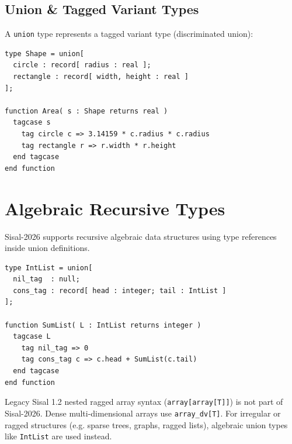 \subsection{Union \& Tagged Variant Types}
A \texttt{union} type represents a tagged variant type (discriminated union):
\begin{lstlisting}[caption={Union Type Declaration}]
type Shape = union[ 
  circle : record[ radius : real ]; 
  rectangle : record[ width, height : real ] 
];

function Area( s : Shape returns real )
  tagcase s
    tag circle c => 3.14159 * c.radius * c.radius
    tag rectangle r => r.width * r.height
  end tagcase
end function
\end{lstlisting}

\section{Algebraic Recursive Types}
Sisal-2026 supports recursive algebraic data structures using type references inside union definitions.

\begin{lstlisting}[caption={Algebraic Recursive List Type}]
type IntList = union[
  nil_tag  : null;
  cons_tag : record[ head : integer; tail : IntList ]
];

function SumList( L : IntList returns integer )
  tagcase L
    tag nil_tag => 0
    tag cons_tag c => c.head + SumList(c.tail)
  end tagcase
end function
\end{lstlisting}

\begin{note}
Legacy Sisal 1.2 nested ragged array syntax (\texttt{array[array[T]]}) is not part of Sisal-2026. Dense multi-dimensional arrays use \texttt{array\_dv[T]}. For irregular or ragged structures (e.g. sparse trees, graphs, ragged lists), algebraic union types like \texttt{IntList} are used instead.
\end{note}
